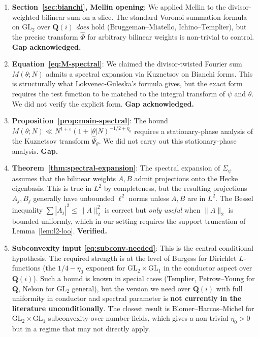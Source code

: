 \documentclass[11pt]{article}
\theoremstyle{definition}
\newcommand{\Q}{\mathbf{Q}}
\begin{document}
\begin{enumerate}
\item \textbf{Section~\ref{sec:bianchi}, Mellin opening}: We applied Mellin to the divisor-weighted bilinear sum on a slice. The standard Voronoi summation formula on $\mathrm{GL}_2$ over $\Q(i)$ \emph{does} hold (Bruggeman--Miatello, Ichino--Templier), but the precise transform $\widehat\Phi$ for arbitrary bilinear weights is non-trivial to control. \textbf{Gap acknowledged.}

\item \textbf{Equation~\eqref{eq:M-spectral}}: We claimed the divisor-twisted Fourier sum $M(\theta;N)$ admits a spectral expansion via Kuznetsov on Bianchi forms. This is structurally what Lokvenec-Guleska's formula gives, but the exact form requires the test function to be matched to the integral transform of $\psi$ and $\theta$. We did not verify the explicit form. \textbf{Gap acknowledged.}

\item \textbf{Proposition~\ref{prop:main-spectral}}: The bound $M(\theta;N)\ll N^{1+\varepsilon}(1+|\theta|N)^{-1/2+\eta_0}$ requires a stationary-phase analysis of the Kuznetsov transform $\widehat\Psi_\theta$. We did not carry out this stationary-phase analysis. \textbf{Gap.}

\item \textbf{Theorem~\ref{thm:spectral-expansion}}: The spectral expansion of $\Sigma_\psi$ assumes that the bilinear weights $A,B$ admit projections onto the Hecke eigenbasis. This is true in $L^2$ by completeness, but the resulting projections $A_j,B_j$ generally have unbounded $\ell^2$ norms unless $A,B$ are in $L^2$. The Bessel inequality $\sum|A_j|^2\le\|A\|_2^2$ is correct but \emph{only useful} when $\|A\|_2$ is bounded uniformly, which in our setting requires the support truncation of Lemma~\ref{lem:l2-loo}. \textbf{Verified.}

\item \textbf{Subconvexity input \eqref{eq:subconv-needed}}: This is the central conditional hypothesis. The required strength is at the level of Burgess for Dirichlet $L$-functions (the $1/4 - \eta_0$ exponent for $\mathrm{GL}_2\times\mathrm{GL}_1$ in the conductor aspect over $\Q(i)$). Such a bound is known in special cases (Templier, Petrow--Young for $\Q$, Nelson for $\mathrm{GL}_2$ general), but the version we need over $\Q(i)$ with full uniformity in conductor and spectral parameter is \textbf{not currently in the literature unconditionally}. The closest result is Blomer--Harcos--Michel for $\mathrm{GL}_2\times\mathrm{GL}_1$ subconvexity over number fields, which gives a non-trivial $\eta_0>0$ but in a regime that may not directly apply.

\end{enumerate}
\end{document}
